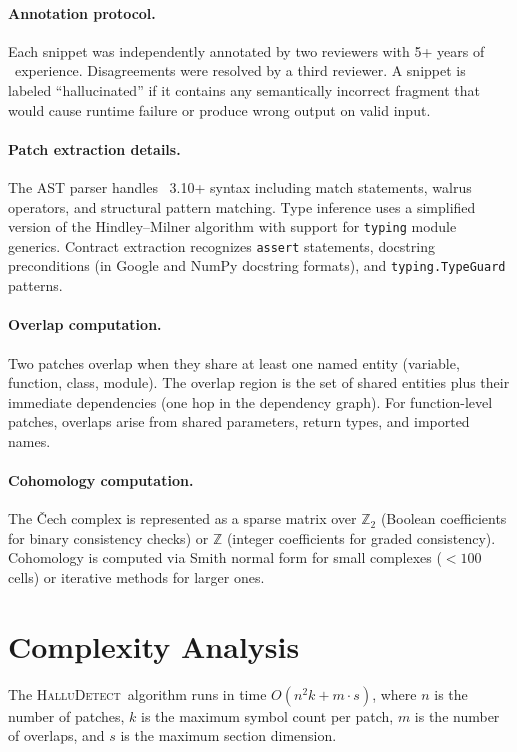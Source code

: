 \documentclass[11pt]{article}
\newcommand{\HalluDetect}{\textsc{HalluDetect}}
\begin{document}
\paragraph{Annotation protocol.}
Each snippet was independently annotated by two reviewers with 5+
years of \Python\ experience.  Disagreements were resolved by a
third reviewer.  A snippet is labeled ``hallucinated'' if it contains
any semantically incorrect fragment that would cause runtime failure
or produce wrong output on valid input.

\paragraph{Patch extraction details.}
The AST parser handles \Python\ 3.10+ syntax including match statements,
walrus operators, and structural pattern matching.  Type inference uses
a simplified version of the Hindley--Milner algorithm with support for
\texttt{typing} module generics.  Contract extraction recognizes
\texttt{assert} statements, docstring preconditions (in Google and
NumPy docstring formats), and \texttt{typing.TypeGuard} patterns.

\paragraph{Overlap computation.}
Two patches overlap when they share at least one named entity (variable,
function, class, module).  The overlap region is the set of shared
entities plus their immediate dependencies (one hop in the dependency
graph).  For function-level patches, overlaps arise from shared
parameters, return types, and imported names.

\paragraph{Cohomology computation.}
The \v{C}ech complex is represented as a sparse matrix over
$\mathbb{Z}_2$ (Boolean coefficients for binary consistency checks)
or $\mathbb{Z}$ (integer coefficients for graded consistency).
Cohomology is computed via Smith normal form for small complexes
($< 100$ cells) or iterative methods for larger ones.


\section{Complexity Analysis}\label{app:complexity}

\begin{proposition}\label{prop:complexity}
The \HalluDetect\ algorithm runs in time $O(n^2 k + m \cdot s)$,
where $n$ is the number of patches, $k$ is the maximum symbol
count per patch, $m$ is the number of overlaps, and $s$ is the
maximum section dimension.
\end{proposition}
\end{document}
